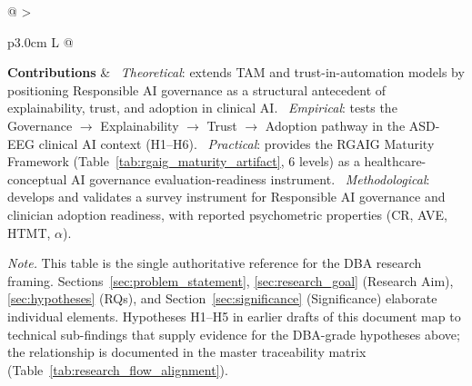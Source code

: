 {\begin{xltabular}{\textwidth}{@{} >{\raggedright\arraybackslash}p{3.0cm} L @{}}
\midrule
\textbf{Contributions} & \textbullet\ \emph{Theoretical}: extends TAM and trust-in-automation models by positioning Responsible AI governance as a structural antecedent of explainability, trust, and adoption in clinical AI. \quad \textbullet\ \emph{Empirical}: tests the Governance $\to$ Explainability $\to$ Trust $\to$ Adoption pathway in the ASD-EEG clinical AI context (H1--H6). \quad \textbullet\ \emph{Practical}: provides the RGAIG Maturity Framework (Table~\ref{tab:rgaig_maturity_artifact}, 6 levels) as a healthcare-conceptual AI governance evaluation-readiness instrument. \quad \textbullet\ \emph{Methodological}: develops and validates a survey instrument for Responsible AI governance and clinician adoption readiness, with reported psychometric properties (CR, AVE, HTMT, $\alpha$). \\
\end{xltabular}}
\vspace{0.5em}
\noindent\textit{Note.} This table is the single authoritative reference for the DBA research framing. Sections~\ref{sec:problem_statement}, \ref{sec:research_goal} (Research Aim), \ref{sec:hypotheses} (RQs), and Section~\ref{sec:significance} (Significance) elaborate individual elements. Hypotheses H1--H5 in earlier drafts of this document map to technical sub-findings that supply evidence for the DBA-grade hypotheses above; the relationship is documented in the master traceability matrix (Table~\ref{tab:research_flow_alignment}).

